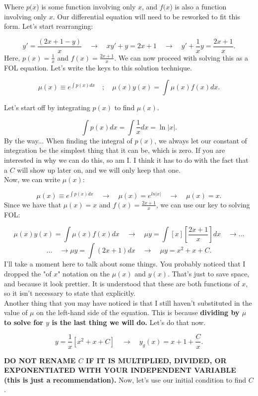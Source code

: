 \documentclass[a4paper,12pt]{article}
\begin{document}
Where $p(x$) is some function involving only $x$, and $f(x$) is also a function involving only $x$. Our differential equation will need to be reworked to fit this form. Let's start rearranging:

$$ y' = \frac{(2x+1 - y)}{x} \quad\rightarrow\quad xy' + y = 2x+1 \quad\rightarrow\quad y' + \frac{1}{x}y = \frac{2x + 1}{x}.   $$
Here, $p(x) = \frac{1}{x}$ and $f(x) = \frac{2x + 1}{x}$. We can now proceed with solving this as a FOL equation. Let's write the keys to this solution technique.

$$ \mu(x) \equiv e^{\int p(x) dx} \quad;\quad \mu(x)y(x) = \int \mu(x)f(x)dx .$$

Let's start off by integrating $p(x)$ to find $\mu(x)$.

$$ \int p(x) dx = \int\frac{1}{x}dx = \ln{|x|}. $$
By the way... When finding the integral of $p(x)$, we always let our constant of integration be the simplest thing that it can be, which is zero. If you are interested in why we can do this, so am I. I think it has to do with the fact that a $C$ will show up later on, and we will only keep that one.\\

Now, we can write $\mu(x)$:

$$ \mu(x) \equiv e^{\int p(x) dx} \quad\rightarrow\quad \mu(x) = e^{ln{|x|}} \quad\rightarrow\quad \mu(x) = x. $$
Since we have that $\mu(x) = x$ and $f(x) = \frac{2x + 1}{x}$, we can use our key to solving FOL:

$$ \mu(x)y(x) = \int \mu(x) f(x) dx \quad\rightarrow\quad \mu y = \int \left[x\right]\left[\frac{2x + 1}{x}\right]dx \quad\rightarrow\ldots $$
$$ \ldots\quad\rightarrow \mu y = \int (2x + 1)dx \quad\rightarrow\quad \mu y = x^2 + x + C.$$
I'll take a moment here to talk about some things. You probably noticed that I dropped the "of $x$" notation on the $\mu(x)$ and $y(x)$. That's just to save space, and because it look prettier. It is understood that these are both functions of $x$, so it isn't necessary to state that explicitly.\\

Another thing that you may have noticed is that I still haven't substituted in the value of $\mu$ on the left-hand side of the equation. This is because \textbf{dividing by $\mu$ to solve for $y$ is the last thing we will do.} Let's do that now.

$$ y = \frac{1}{x}[x^2 + x + C] \quad\rightarrow\quad y_g(x) = x + 1 + \frac{C}{x}.$$

\textbf{DO NOT RENAME $C$ IF IT IS MULTIPLIED, DIVIDED, OR EXPONENTIATED WITH YOUR INDEPENDENT VARIABLE (this is just a recommendation).} Now, let's use our initial condition to find $C$.
\end{document}
